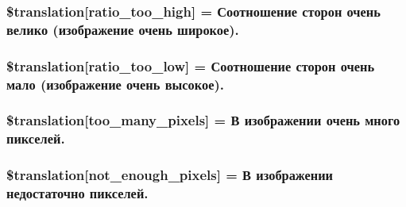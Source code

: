 \subsubsection[{\$translation}]{\setlength{\rightskip}{0pt plus 5cm}\$translation\mbox{[}\textquotesingle{}ratio\+\_\+too\+\_\+high\textquotesingle{}\mbox{]} = \textquotesingle{}Соотношение сторон очень велико (изображение очень широкое).\textquotesingle{}}\label{class_8upload_8ru___r_u_8php_a23396f6ce7f31e5e5f1b57580621d982}
\hypertarget{class_8upload_8ru___r_u_8php_ac533b9a479f056b0b8623e4268f068c2}{}
\subsubsection[{\$translation}]{\setlength{\rightskip}{0pt plus 5cm}\$translation\mbox{[}\textquotesingle{}ratio\+\_\+too\+\_\+low\textquotesingle{}\mbox{]} = \textquotesingle{}Соотношение сторон очень мало (изображение очень высокое).\textquotesingle{}}\label{class_8upload_8ru___r_u_8php_ac533b9a479f056b0b8623e4268f068c2}
\hypertarget{class_8upload_8ru___r_u_8php_aa4051ef64e94a3f8295c63cf85544016}{}
\subsubsection[{\$translation}]{\setlength{\rightskip}{0pt plus 5cm}\$translation\mbox{[}\textquotesingle{}too\+\_\+many\+\_\+pixels\textquotesingle{}\mbox{]} = \textquotesingle{}В изображении очень много пикселей.\textquotesingle{}}\label{class_8upload_8ru___r_u_8php_aa4051ef64e94a3f8295c63cf85544016}
\hypertarget{class_8upload_8ru___r_u_8php_a1fe342c27ce61f4ff4e0120ba647033e}{}
\subsubsection[{\$translation}]{\setlength{\rightskip}{0pt plus 5cm}\$translation\mbox{[}\textquotesingle{}not\+\_\+enough\+\_\+pixels\textquotesingle{}\mbox{]} = \textquotesingle{}В изображении недостаточно пикселей.\textquotesingle{}}\label{class_8upload_8ru___r_u_8php_a1fe342c27ce61f4ff4e0120ba647033e}
\hypertarget{class_8upload_8ru___r_u_8php_a4ce76e7be0b3a03c2b47f6d70c21832e}{}
